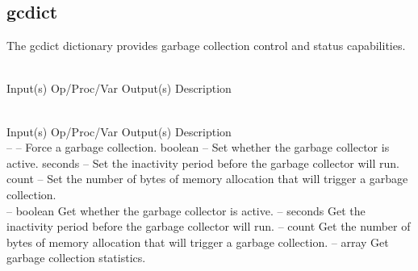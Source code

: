 %
%
%
%
%

\subsection{gcdict}
\label{sec:gcdict}

The gcdict dictionary provides garbage collection control and status
capabilities.

\begin{longtable}{}
\caption{gcdict summary}
\\
\hline
\optableent
	{Input(s)}
	{Op/Proc/Var}
	{Output(s)}
	{Description}
\hline \hline
\endfirsthead
\caption[]{\emph{continued}} \\
\hline
\optableent
	{Input(s)}
	{Op/Proc/Var}
	{Output(s)}
	{Description}
\hline \hline \endhead
{} \endfoot
\hline \endlastfoot
 \\
\hline \hline
\optableent
	{--}
	{{\bf {}}}
	{--}
	{Force a garbage collection.}
\hline
\optableent
	{boolean}
	{{\bf {}}}
	{--}
	{Set whether the garbage collector is active.}
\hline
\optableent
	{seconds}
	{{\bf {}}}
	{--}
	{Set the inactivity period before the garbage collector will run.}
\hline
\optableent
	{count}
	{{\bf {}}}
	{--}
	{Set the number of bytes of memory allocation that will trigger a garbage collection.}
\hline \hline
{} \\
\hline \hline
\optableent
	{--}
	{{\bf {}}}
	{boolean}
	{Get whether the garbage collector is active.}
\hline
\optableent
	{--}
	{{\bf {}}}
	{seconds}
	{Get the inactivity period before the garbage collector will run.}
\hline
\optableent
	{--}
	{{\bf {}}}
	{count}
	{Get the number of bytes of memory allocation that will trigger a garbage collection.}
\hline
\optableent
	{--}
	{{\bf {}}}
	{array}
	{Get garbage collection statistics.}
\end{longtable}

